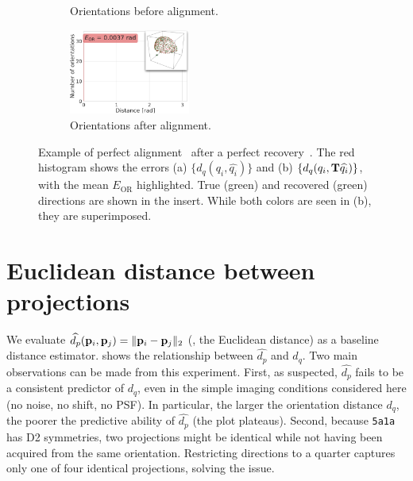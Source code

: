 \begin{figure}[ht!]
\begin{minipage}[t]{0.64\linewidth}
\begin{subfigure}[t]{0.49\linewidth}
            \caption{Orientations before alignment.}
        \end{subfigure}
        \hfill
        \begin{subfigure}[t]{0.49\linewidth}
            \centering
            \includegraphics[height=2.8cm]{figures/AfterAA.pdf}
            \caption{Orientations after alignment.}
        \end{subfigure}
        \caption{%
            Example of perfect alignment~ after a perfect recovery~.
            The red histogram shows the errors (a) $\{d_q(q_i, \widehat{q_i})\}$ and (b) $\{d_q(q_i, \mathbf{T} \widehat{q_i})\}$, with the mean $E_\text{OR}$ highlighted.
            True (green) and recovered (green) directions are shown in the insert.
            While both colors are seen in (b), they are superimposed.
        }\label{fig:5j0n-aa-loss-perfect-distances}
    \end{minipage}
\end{figure}

\section{Euclidean distance between projections}\label{apx:results:distance-estimation:euclidean}


We evaluate $\widehat{d_p}(\mathbf{p}_i, \mathbf{p}_j) = \| \mathbf{p}_i - \mathbf{p}_j \|_2$ (\ie, the Euclidean distance) as a baseline distance estimator.
 shows the relationship between $\widehat{d_p}$ and $d_q$.
Two main observations can be made from this experiment.
First, as suspected, $\widehat{d_p}$ fails to be a consistent predictor of $d_q$, even in the simple imaging conditions considered here (no noise, no shift, no PSF).
In particular, the larger the orientation distance $d_q$, the poorer the predictive ability of $\widehat{d_p}$ (the plot plateaus).
Second, because \texttt{5a1a} has D2 symmetries, two projections might be identical while not having been acquired from the same orientation.
Restricting directions to a quarter captures only one of four identical projections, solving the issue.

